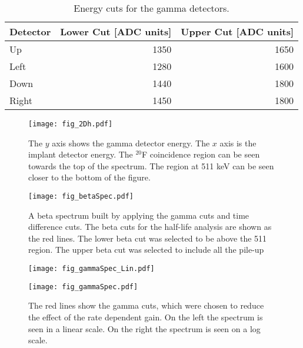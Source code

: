 \documentclass[MaxHughesThesis.tex]{subfiles}
\begin{document}
\begin{table}[!htb]
	\centering
	\caption{Energy cuts for the gamma detectors.}
	\begin{tabular}{lrr}
	Detector & Lower Cut [ADC units] & Upper Cut [ADC units] \\ \hline
	Up & 1350 & 1650 \\
	Left & 1280 & 1600\\
	Down & 1440 & 1800 \\
	Right & 1450 & 1800
	\end{tabular}
	\label{tab:GammaCuts}
\end{table}

\begin{figure}[!htb]
	\centerline{\texttt{[image: fig\_2Dh.pdf]}}
	\caption{The $y$ axis shows the gamma detector energy.
		   The $x$ axis is the implant detector energy.
		   The $^{20}$F coincidence region can be seen towards the top of the spectrum.
		   The region at 511 keV can be seen closer to the bottom of the figure.
		   }
	\label{fig:2DGraph}
\end{figure}

\begin{figure}[!htb]
	\centerline{\texttt{[image: fig\_betaSpec.pdf]}}
	\caption{
		 A beta spectrum built by applying the gamma cuts and time difference cuts. 
		 The beta cuts for the half-life analysis are shown as the red lines.
		 The lower beta cut was selected to be above the 511 region.
		 The upper beta cut was selected to include all the pile-up}
	
	\label{fig:BetaGraph}
\end{figure}

\begin{figure}[!htb]
        \centering
        \begin{minipage}{0.50\textwidth}
            \centerline{\texttt{[image: fig\_gammaSpec\_Lin.pdf]}}
        \end{minipage}\hfill
        \begin{minipage}{0.50\textwidth}
            \centerline{\texttt{[image: fig\_gammaSpec.pdf]}}
        \end{minipage}
	\caption{The red lines show the gamma cuts, which were chosen to reduce the effect of the rate dependent gain. 
		 On the left the spectrum is seen in a linear scale.
		 On the right the spectrum is seen on a log scale.}
	\label{fig:GammaGraph}
\end{figure}
\end{document}
